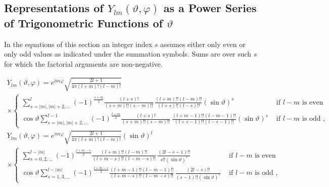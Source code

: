 \subsection{Representations of $Y_{l m}(\vartheta, \varphi)$ as a Power Series of Trigonometric Functions of $\vartheta$}\label{sec:5.2.3}
In the equations of this section an integer index $s$ assumes either only even or only odd values as indicated under the summation symbols. Sums are over such $s$ for which the factorial arguments are non-negative.
\begin{fleqn}
\begin{multline}
Y_{l m}(\vartheta, \varphi)=e^{i m \varphi} \sqrt{\frac{2 l+1}{4 \pi(l+m)!(l-m)!}}  \\
\times\begin{cases}
\sum_{s=|m|,|m|+2, \ldots}^{l}(-1)^{\frac{s+m}{2}} \frac{(l+s)!}{(s+m)!!(s-m)!!} \, \frac{(l+m)!!(l-m)!!}{(l+s)!!(l-s)!!}(\sin \vartheta)^{s} &
\text { if } l-m \text { is even } \\
\cos \vartheta \sum_{s=|m|,|m|+2, \ldots}^{l-1}(-1)^{\frac{l+m}{2}} \frac{(l+s)!}{(s+m)!!(s-m)!!} \, \frac{(l+m-1)!!(l-m-1)!!}{(l+s-1)!!(l-s-1)!!}(\sin \vartheta)^{s} &
\text { if } l-m \text { is odd },
\end{cases}
  \label{eq:5:2:17}
\end{multline}
\begin{multline}
Y_{l m}(\vartheta, \varphi)=e^{i m \varphi} \sqrt{\frac{2 l+1}{4 \pi(l+m)!(l-m)!}}(\sin \vartheta)^{l}  \\
\times\begin{cases}
\sum_{s=0,2, \ldots}^{l-|m|}(-1)^{\frac{l+m-s}{2}} \frac{(l+m)!!(l-m)!!}{(l+m-s)!!(l-m-s)!!} \, \frac{(2 l-s-1)!!}{s!!(\sin \vartheta)^s} &
\text { if } l-m \text { is even } \\
\cos \vartheta \sum_{s=1,3, \ldots}^{l-|m|}(-1)^{\frac{l+m-s}{2}} \frac{(l+m-1)!!(l-m-1)!!}{(l+m-s)!!(l-m-s)!!} \, \frac{(2 l-s)!!}{(s-1)!!(\sin \vartheta)^s} &
\text { if } l-m \text { is odd },
\end{cases}  \label{eq:5:2:18}
\end{multline}

\end{fleqn}
